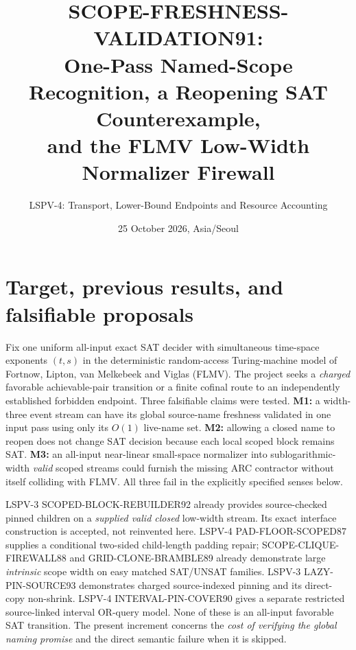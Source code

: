 \documentclass[11pt]{article}
\title{SCOPE-FRESHNESS-VALIDATION91:\\
One-Pass Named-Scope Recognition, a Reopening SAT Counterexample,\\
and the FLMV Low-Width Normalizer Firewall}
\author{LSPV-4: Transport, Lower-Bound Endpoints and Resource Accounting}
\date{25 October 2026, Asia/Seoul}
\begin{document}
\maketitle
\begin{center}
\end{center}

\section{Target, previous results, and falsifiable proposals}
Fix one uniform all-input exact SAT decider with simultaneous time-space exponents
$(t,s)$ in the deterministic random-access Turing-machine model of
Fortnow, Lipton, van Melkebeek and Viglas (FLMV).
The project seeks a \emph{charged} favorable achievable-pair transition
or a finite cofinal route to an independently established forbidden endpoint.
Three falsifiable claims were tested.
\textbf{M1:} a width-three event stream can have its global source-name
freshness validated in one input pass using only its $O(1)$ live-name set.
\textbf{M2:} allowing a closed name to reopen does not change SAT decision
because each local scoped block remains SAT.
\textbf{M3:} an all-input near-linear small-space normalizer into
sublogarithmic-width \emph{valid} scoped streams could furnish the
missing ARC contractor without itself colliding with FLMV.
All three fail in the explicitly specified senses below.

LSPV-3 SCOPED-BLOCK-REBUILDER92 already provides source-checked pinned
children on a \emph{supplied valid closed} low-width stream. Its exact
interface construction is accepted, not reinvented here.
LSPV-4 PAD-FLOOR-SCOPED87 supplies a conditional two-sided child-length
padding repair; SCOPE-CLIQUE-FIREWALL88 and GRID-CLONE-BRAMBLE89
already demonstrate large \emph{intrinsic} scope width on easy
matched SAT/UNSAT families. LSPV-3 LAZY-PIN-SOURCE93 demonstrates
charged source-indexed pinning and its direct-copy non-shrink.
LSPV-4 INTERVAL-PIN-COVER90 gives a separate restricted
source-linked interval OR-query model. None of these is an all-input
favorable SAT transition. The present increment concerns the
\emph{cost of verifying the global naming promise} and the direct
semantic failure when it is skipped.
\end{document}
